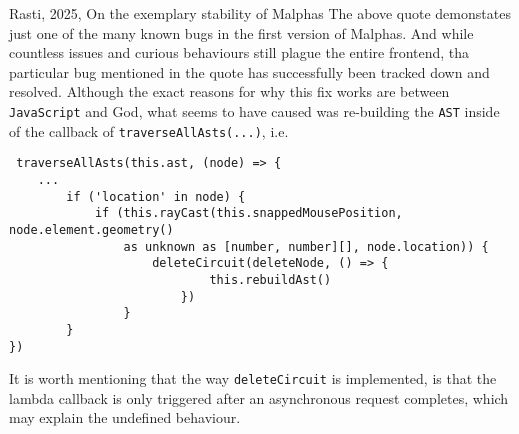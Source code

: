 {Rasti, 2025, On the exemplary stability of Malphas}
\vspace{\baselineskip}
The above quote demonstates just one of the many known bugs in the first version of Malphas. And while countless issues
and curious behaviours still plague the entire frontend, tha particular bug mentioned in the quote has successfully been
tracked down and resolved. Although the exact reasons for why this fix works are between \verb|JavaScript| and God,
what seems to have caused was re-building the \verb|AST| inside of the callback of \verb|traverseAllAsts(...)|, i.e.
\begin{lstlisting}
 traverseAllAsts(this.ast, (node) => {
	...
        if ('location' in node) {
        	if (this.rayCast(this.snappedMousePosition, node.element.geometry()
				as unknown as [number, number][], node.location)) {
                	deleteCircuit(deleteNode, () => {
                        	this.rebuildAst()
                        })
                }
        }
})
\end{lstlisting}
It is worth mentioning that the way \verb|deleteCircuit| is implemented, is that the lambda callback is only triggered
after an asynchronous request completes, which may explain the undefined behaviour.
